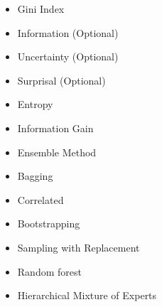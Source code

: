 \begin{itemize}
        \item Gini Index 
        \item Information (Optional)
        \item Uncertainty (Optional)
        \item Surprisal (Optional)
        \item Entropy
        \item Information Gain
        \item Ensemble Method
        \item Bagging
        \item Correlated
        \item Bootstrapping
        \item Sampling with Replacement
        \item Random forest
        \item Hierarchical Mixture of Experts
    \end{itemize}